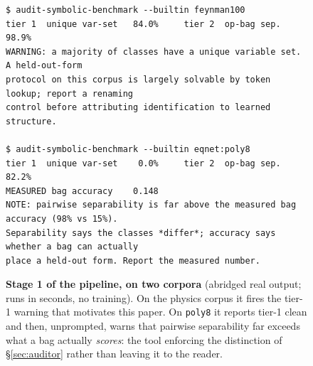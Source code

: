 \begin{figure}[H]
\centering
\begin{minipage}{0.99\linewidth}
\footnotesize
\begin{verbatim}
$ audit-symbolic-benchmark --builtin feynman100
tier 1  unique var-set   84.0%     tier 2  op-bag sep.  98.9%
WARNING: a majority of classes have a unique variable set. A held-out-form
protocol on this corpus is largely solvable by token lookup; report a renaming
control before attributing identification to learned structure.

$ audit-symbolic-benchmark --builtin eqnet:poly8
tier 1  unique var-set    0.0%     tier 2  op-bag sep.  82.2%
MEASURED bag accuracy    0.148
NOTE: pairwise separability is far above the measured bag accuracy (98% vs 15%).
Separability says the classes *differ*; accuracy says whether a bag can actually
place a held-out form. Report the measured number.
\end{verbatim}
\end{minipage}
\caption{\textbf{Stage 1 of the pipeline, on two corpora} (abridged real output; runs in seconds,
no training). On the physics corpus it fires the tier-1 warning that motivates this paper. On
\texttt{poly8} it reports tier-1 clean and then, unprompted, warns that pairwise separability far
exceeds what a bag actually \emph{scores}: the tool enforcing the distinction of
\S\ref{sec:auditor} rather than leaving it to the reader.}
\label{fig:cli}
\end{figure}
